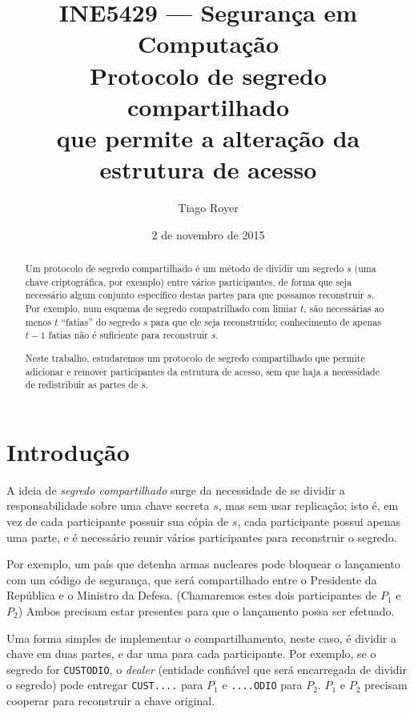 \documentclass[10pt,twocolumn]{article}
\begin{document}
\title{
    INE5429 --- Segurança em Computação \\[1ex]
    Protocolo de segredo compartilhado \\
    que permite a alteração da estrutura de acesso \\[1ex]
}
\author{Tiago Royer}
\date{2 de novembro de 2015}
\maketitle

\begin{abstract}
    Um protocolo de segredo compartilhado
    é um método de dividir um segredo $s$
    (uma chave criptográfica, por exemplo)
    entre vários participantes,
    de forma que seja necessário algum conjunto específico destas partes
    para que possamos reconstruir $s$.
    Por exemplo,
    num esquema de segredo compatrilhado com limiar $t$,
    são necessárias ao menos $t$ ``fatias'' do segredo $s$
    para que ele seja reconstruído;
    conhecimento de apenas $t-1$ fatias não é suficiente para reconstruir $s$.

    Neste trabalho,
    estudaremos um protocolo de segredo compartilhado
    que permite adicionar e remover participantes da estrutura de acesso,
    sem que haja a necessidade de redistribuir as partes de $s$.
\end{abstract}

\section{Introdução}

A ideia de \emph{segredo compartilhado}
surge da necessidade de se dividir a responsabilidade sobre uma chave secreta $s$,
mas sem usar replicação;
isto é,
em vez de cada participante possuir sua cópia de $s$,
cada participante possui apenas uma parte,
e é necessário reunir vários participantes para reconstruir o segredo.

Por exemplo,
um país que detenha armas nucleares
pode bloquear o lançamento com um código de segurança,
que será compartilhado entre o Presidente da República e o Ministro da Defesa.
(Chamaremos estes dois participantes de $P_1$ e $P_2$)
Ambos precisam estar presentes para que o lançamento possa ser efetuado.

Uma forma simples de implementar o compartilhamento, neste caso,
é dividir a chave em duas partes,
e dar uma para cada participante.
Por exemplo,
se o segredo for \texttt{CUSTODIO},
o \emph{dealer}
(entidade confiável que será encarregada de dividir o segredo)
pode entregar \texttt{CUST....} para $P_1$
e \texttt{....ODIO} para $P_2$.
$P_1$ e $P_2$ precisam cooperar para reconstruir a chave original.
\end{document}
